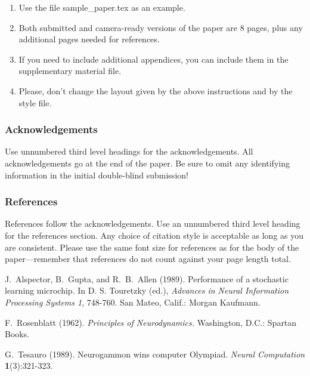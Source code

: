 \documentclass[twoside]{article}
\begin{document}
\begin{enumerate}
    \item Use the file sample\_paper.tex as an example.

    \item Both submitted and camera-ready versions of the paper are 8
      pages, plus any additional pages needed for references.

    \item If you need to include additional appendices,
      you can include them in the supplementary
      material file.

    \item Please, don't change the layout given by the above
      instructions and by the style file.

\end{enumerate}

\subsubsection*{Acknowledgements}

Use unnumbered third level headings for the acknowledgements.  All
acknowledgements go at the end of the paper.  Be sure to omit any
identifying information in the initial double-blind submission!


\subsubsection*{References}

References follow the acknowledgements.  Use an unnumbered third level
heading for the references section.  Any choice of citation style is
acceptable as long as you are consistent.  Please use the same font
size for references as for the body of the paper---remember that
references do not count against your page length total.

J.~Alspector, B.~Gupta, and R.~B.~Allen (1989). Performance of a
stochastic learning microchip.  In D. S. Touretzky (ed.), {\it
  Advances in Neural Information Processing Systems 1}, 748-760.  San
Mateo, Calif.: Morgan Kaufmann.

F.~Rosenblatt (1962). {\it Principles of Neurodynamics.} Washington,
D.C.: Spartan Books.

G.~Tesauro (1989). Neurogammon wins computer Olympiad.  {\it Neural
  Computation} {\bf 1}(3):321-323.
\end{document}
